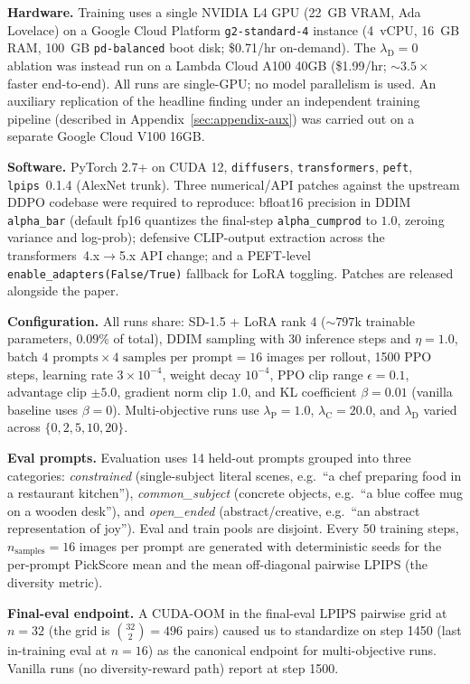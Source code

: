 \documentclass[10pt,letterpaper]{article}
\newcommand{\paragraphhead}[1]{\vspace{0.4ex}\noindent\textbf{#1}\hspace{0.5em}}
\newcommand{\lambdaP}{\lambda_{\mathrm{P}}}
\newcommand{\lambdaC}{\lambda_{\mathrm{C}}}
\newcommand{\lambdaD}{\lambda_{\mathrm{D}}}
\begin{document}
\paragraphhead{Hardware.}
Training uses a single NVIDIA L4 GPU (22~GB VRAM, Ada Lovelace) on a Google Cloud Platform \texttt{g2-standard-4} instance (4~vCPU, 16~GB RAM, 100~GB \texttt{pd-balanced} boot disk; \$0.71/hr on-demand). The $\lambdaD{=}0$ ablation was instead run on a Lambda Cloud A100 40GB (\$1.99/hr; ${\sim}3.5{\times}$ faster end-to-end). All runs are single-GPU; no model parallelism is used. An auxiliary replication of the headline finding under an independent training pipeline (described in Appendix~\ref{sec:appendix-aux}) was carried out on a separate Google Cloud V100 16GB.

\paragraphhead{Software.}
PyTorch 2.7+ on CUDA 12, \texttt{diffusers}, \texttt{transformers}, \texttt{peft}, \texttt{lpips}~0.1.4 (AlexNet trunk). Three numerical/API patches against the upstream DDPO codebase were required to reproduce: bfloat16 precision in DDIM \texttt{alpha\_bar} (default fp16 quantizes the final-step \texttt{alpha\_cumprod} to $1.0$, zeroing variance and log-prob); defensive CLIP-output extraction across the transformers~4.x$\to$5.x API change; and a PEFT-level \texttt{enable\_adapters(False/True)} fallback for LoRA toggling. Patches are released alongside the paper.

\paragraphhead{Configuration.}
All runs share: SD-1.5 + LoRA rank 4 (${\sim}797$k trainable parameters, $0.09\%$ of total), DDIM sampling with 30 inference steps and $\eta=1.0$, batch $4 \text{ prompts} \times 4 \text{ samples per prompt} = 16$ images per rollout, 1500 PPO steps, learning rate $3{\times}10^{-4}$, weight decay $10^{-4}$, PPO clip range $\epsilon = 0.1$, advantage clip $\pm 5.0$, gradient norm clip $1.0$, and KL coefficient $\beta = 0.01$ (vanilla baseline uses $\beta = 0$). Multi-objective runs use $\lambdaP = 1.0$, $\lambdaC = 20.0$, and $\lambdaD$ varied across $\{0, 2, 5, 10, 20\}$.

\paragraphhead{Eval prompts.}
Evaluation uses 14 held-out prompts grouped into three categories: \emph{constrained} (single-subject literal scenes, e.g.\ ``a chef preparing food in a restaurant kitchen''), \emph{common\_subject} (concrete objects, e.g.\ ``a blue coffee mug on a wooden desk''), and \emph{open\_ended} (abstract/creative, e.g.\ ``an abstract representation of joy''). Eval and train pools are disjoint. Every 50 training steps, $n_{\text{samples}}{=}16$ images per prompt are generated with deterministic seeds for the per-prompt PickScore mean and the mean off-diagonal pairwise LPIPS (the diversity metric).

\paragraphhead{Final-eval endpoint.}
A CUDA-OOM in the final-eval LPIPS pairwise grid at $n{=}32$ (the grid is $\binom{32}{2} = 496$ pairs) caused us to standardize on step 1450 (last in-training eval at $n{=}16$) as the canonical endpoint for multi-objective runs. Vanilla runs (no diversity-reward path) report at step 1500.
\end{document}
